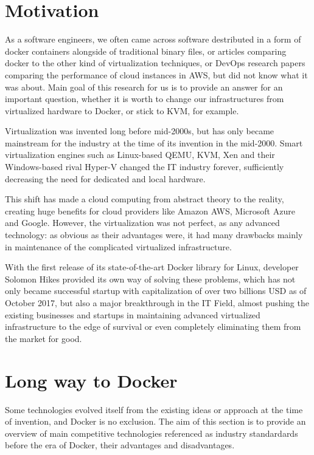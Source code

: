 
\section{Motivation}

As a software engineers,
we often came across software destributed
in a form of docker containers alongside
of traditional binary files,
or articles comparing docker to the other kind of virtualization techniques,
or DevOps research papers comparing the performance of cloud instances in AWS,
but did not know what it was about.
Main goal of this research for us is to provide an answer
for an important question, whether it is worth
to change our infrastructures
from virtualized hardware to Docker, or stick to KVM, for example.

Virtualization was invented long before mid-2000s,
but has only became mainstream for the industry at the
time of its invention in the mid-2000.
Smart virtualization engines such as Linux-based QEMU, KVM, Xen
and their Windows-based rival Hyper-V changed the IT industry forever,
sufficiently decreasing the need for dedicated and local hardware.

This shift has made a cloud computing from abstract theory to the reality,
creating huge benefits for cloud providers like Amazon AWS,
Microsoft Azure and Google.
However, the virtualization was not perfect, as any advanced technology:
as obvious as their advantages were, it had many drawbacks mainly in maintenance
of the complicated virtualized infrastructure.

With the first release of its state-of-the-art Docker library for Linux,
developer Solomon Hikes provided its own way of solving these problems,
which has not only became successful startup
with capitalization of over two billions USD as of October 2017,
but also a major breakthrough in the IT Field, almost pushing the existing
businesses and startups in maintaining advanced virtualized infrastructure
to the edge of survival or even completely eliminating
them from the market for good.

\section{Long way to Docker}

Some technologies evolved itself from the existing ideas
or approach at the time of invention, and Docker is no exclusion.
The aim of this section is to provide an overview of main competitive
technologies referenced as industry standardards
before the era of Docker, their advantages and disadvantages.

